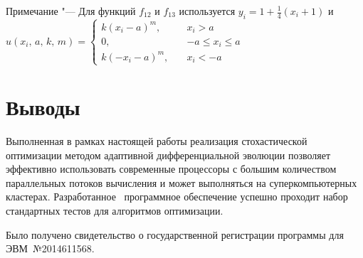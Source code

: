 \begin{longtabu}
{            \hspace*{2.5em}%
            Примечание "---  Для функций $f_{12}$ и $f_{13}$
            используется $y_i = 1 + \frac{1}{4}(x_i+1)$ и
            $u(x_i,\,a,\,k,\,m)=\begin{cases}
k(x_i-a)^m,\quad &x_i >a\\[-0.5em]
0,\quad &-a\leq x_i \leq a\\[-0.5em]
k(-x_i-a)^m,\quad &x_i <-a
\end{cases}$  }   \\        \bottomrule %
\end{longtabu} \endgroup


\section{Выводы}

Выполненная в рамках настоящей работы реализация стохастической
оптимизации методом адаптивной дифференциальной эволюции позволяет
эффективно использовать современные процессоры с большим количеством
параллельных потоков вычисления и может выполняться на
суперкомпьютерных кластерах.  Разработанное~\cite{JADE-web} программное обеспечение
успешно проходит набор стандартных тестов для алгоритмов оптимизации.

 Было получено
свидетельство о государственной регистрации программы для
ЭВМ~№2014611568.
\clearpage